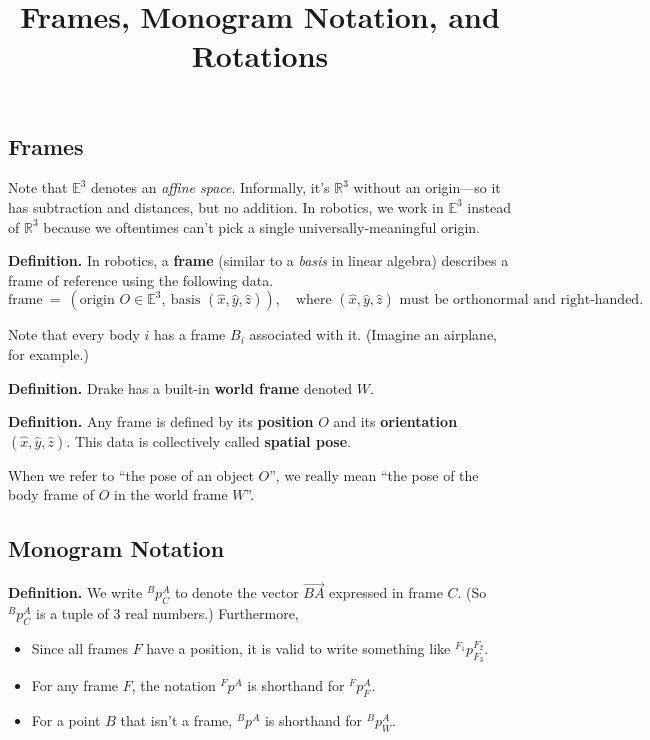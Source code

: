 \title{Frames, Monogram Notation, and Rotations}



\subsection{Frames}

Note that $\mathbb{E}^3$ denotes an \emph{affine space}.
Informally, it's $\mathbb{R}^3$ without an origin---so
it has subtraction and distances, but no addition.
In robotics, we work in $\mathbb{E}^3$ instead of $\mathbb{R}^3$
because we oftentimes can't pick a single universally-meaningful origin.

\textbf{Definition.}
In robotics, a \textbf{frame} (similar to a \emph{basis} in linear algebra)
describes a frame of reference using the following data.
\[ \text{frame} ~ = ~
(\text{origin } O \in \mathbb{E}^3, ~
\text{basis } (\hat{x}, \hat{y}, \hat{z})),
~~~ \text{ where } 
(\hat{x}, \hat{y}, \hat{z})
\text{ must be orthonormal and right-handed.} \]


Note that every body $i$ has a frame $B_i$ associated with it.
(Imagine an airplane, for example.)

\textbf{Definition.} Drake has a built-in \textbf{world frame} denoted $W$.

\textbf{Definition.}
Any frame is defined by its \textbf{position} $O$
and its \textbf{orientation} $(\hat{x}, \hat{y}, \hat{z})$.
This data is collectively called \textbf{spatial pose}.

When we refer to ``the pose of an object $O$'',
we really mean ``the pose of the body frame of $O$ in the world frame $W$''.

\subsection{Monogram Notation}

\textbf{Definition.}
We write $^B p^A_C$ to denote the vector $\vec{BA}$ expressed in frame $C$.
(So $^B p^A_C$ is a tuple of $3$ real numbers.)  Furthermore,
\begin{itemize}
    \item Since all frames $F$ have a position,
    it is valid to write something like $^{F_1}p^{F_2}_{F_3}$.
    \item For any frame $F$, the notation $^Fp^A$
    is shorthand for $^Fp^A_F$.
    \item For a point $B$ that isn't a frame, $^Bp^A$ is shorthand for $^Bp^A_W$.
\end{itemize}

